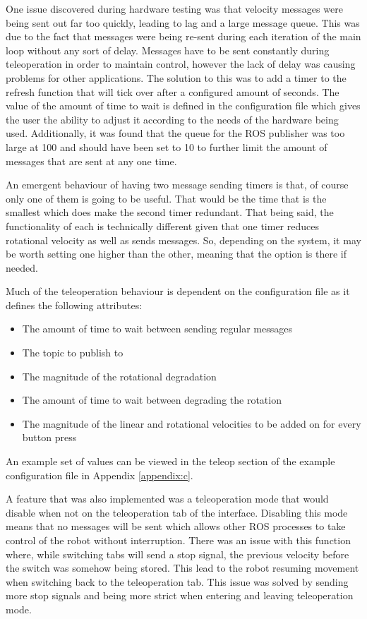 One issue discovered during hardware testing was that velocity messages were being sent out far too quickly, leading to lag and a large message queue. This was due to the fact that messages were being re-sent during each iteration of the main loop without any sort of delay. Messages have to be sent constantly during teleoperation in order to maintain control, however the lack of delay was causing problems for other applications. The solution to this was to add a timer to the refresh function that will tick over after a configured amount of seconds. The value of the amount of time to wait is defined in the configuration file which gives the user the ability to adjust it according to the needs of the hardware being used. Additionally, it was found that the queue for the {\selectfont ROS} publisher was too large at 100 and should have been set to 10 to further limit the amount of messages that are sent at any one time.

An emergent behaviour of having two message sending timers is that, of course only one of them is going to be useful. That would be the time that is the smallest which does make the second timer redundant. That being said, the functionality of each is technically different given that one timer reduces rotational velocity as well as sends messages. So, depending on the system, it may be worth setting one higher than the other, meaning that the option is there if needed.

Much of the teleoperation behaviour is dependent on the configuration file as it defines the following attributes:

\begin{itemize}
  \item The amount of time to wait between sending regular messages
  \item The topic to publish to
  \item The magnitude of the rotational degradation
  \item The amount of time to wait between degrading the rotation
  \item The magnitude of the linear and rotational velocities to be added on for every button press
\end{itemize}

An example set of values can be viewed in the teleop section of the example configuration file in Appendix \ref{appendix:c}.

A feature that was also implemented was a teleoperation mode that would disable when not on the teleoperation tab of the interface. Disabling this mode means that no messages will be sent which allows other {\selectfont ROS} processes to take control of the robot without interruption. There was an issue with this function where, while switching tabs will send a stop signal, the previous velocity before the switch was somehow being stored. This lead to the robot resuming movement when switching back to the teleoperation tab. This issue was solved by sending more stop signals and being more strict when entering and leaving teleoperation mode.

